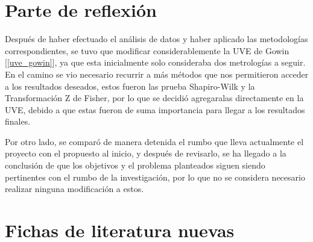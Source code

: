 \section{Parte de reflexión}

Después de haber efectuado el análisis de datos y haber aplicado las metodologías correspondientes, se tuvo que modificar considerablemente la UVE de Gowin [\ref{uve_gowin}], ya que esta inicialmente solo consideraba dos metrologías a seguir. En el camino se vio necesario recurrir a más métodos que nos permitieron acceder a los resultados deseados, estos fueron las prueba Shapiro-Wilk y la Transformación Z de Fisher, por lo que se decidió agregaralas directamente en la UVE, debido a que estas fueron de suma importancia para llegar a los resultados finales.

Por otro lado, se comparó de manera detenida el rumbo que lleva actualmente el proyecto con el propuesto al inicio, y después de revisarlo, se ha llegado a la conclusión de que los objetivos y el problema planteados siguen siendo pertinentes con el rumbo de la investigación, por lo que no se considera necesario realizar ninguna modificación a estos. 
\pagebreak

\section{Fichas de literatura nuevas}

